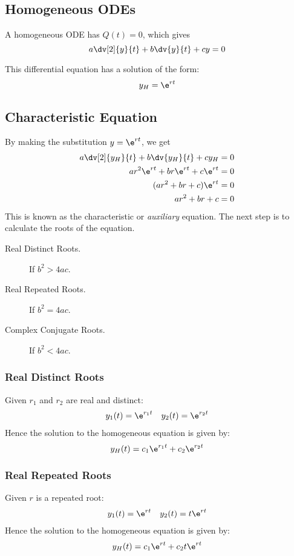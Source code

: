 \documentclass{article}
\begin{document}
\subsection{Homogeneous ODEs}
\begin{definition}
    A homogeneous ODE has \(Q(t)=0\), which gives
    \begin{equation*}
        a \dv[2]{y}{t} + b \dv{y}{t} + c y = 0
    \end{equation*}
\end{definition}
This differential equation has a solution of the form:
\begin{equation*}
    y_H = \e^{rt}
\end{equation*}
\subsection{Characteristic Equation}
By making the substitution \(y=\e^{rt}\), we get
\begin{align*}
    a \dv[2]{y_H}{t} + b \dv{y_H}{t} + c y_H & = 0 \\
    ar^2\e^{rt} + br\e^{rt} + c\e^{rt}       & = 0 \\
    (ar^2 + br + c)\e^{rt}                   & = 0 \\
    ar^2 + br + c                            & = 0
\end{align*}
This is known as the characteristic or \textit{auxiliary} equation. The next step is to calculate the roots of the equation.
\begin{description}
    \item[Real Distinct Roots.] If \(b^2 > 4ac\).
    \item[Real Repeated Roots.] If \(b^2 = 4ac\).
    \item[Complex Conjugate Roots.] If \(b^2 < 4ac\).
\end{description}
\subsubsection{Real Distinct Roots}
Given \(r_1\) and \(r_2\) are real and distinct:
\begin{align*}
    y_1(t) = \e^{r_1t} &  & y_2(t) = \e^{r_2t}
\end{align*}
Hence the solution to the homogeneous equation is given by:
\begin{equation*}
    y_H(t) = c_1\e^{r_1t} + c_2\e^{r_2t}
\end{equation*}
\subsubsection{Real Repeated Roots}
Given \(r\) is a repeated root:
\begin{align*}
    y_1(t) = \e^{rt} &  & y_2(t) = t\e^{rt}
\end{align*}
Hence the solution to the homogeneous equation is given by:
\begin{equation*}
    y_H(t) = c_1\e^{rt} + c_2t\e^{rt}
\end{equation*}
\end{document}
